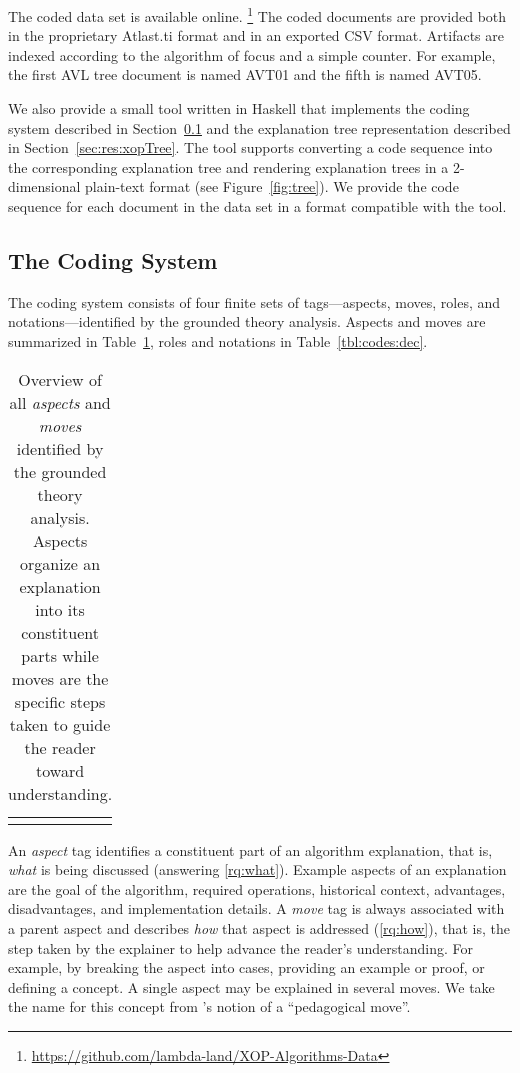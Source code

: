 \documentclass[sigconf]{acmart}
\begin{document}
The coded data set is available online.%
\footnote{\url{https://github.com/lambda-land/XOP-Algorithms-Data}}
%
The coded documents are provided both in the proprietary Atlast.ti format and
in an exported CSV format.
%
Artifacts are indexed according to the algorithm of focus and a simple counter.
For example, the first AVL tree document is named AVT01 and the fifth is named
AVT05.


We also provide a small tool written in Haskell that implements the coding
system described in Section~\ref{sec:res:sys} and the explanation tree
representation described in Section~\ref{sec:res:xopTree}. The tool supports
converting a code sequence into the corresponding explanation tree and
rendering explanation trees in a 2-dimensional plain-text format (see
Figure~\ref{fig:tree}).
%
We provide the code sequence for each document in the data set in a format
compatible with the tool.


\subsection{The Coding System}
\label{sec:res:sys}

The coding system consists of four finite sets of tags---aspects, moves, roles,
and notations---identified by the grounded theory analysis. Aspects and moves
are summarized in Table~\ref{tbl:codes:main}, roles and notations in
Table~\ref{tbl:codes:dec}.


\begin{table}
\begin{tabular}{ll}

\\[-1.5ex]

\\[-1.5ex]
\end{tabular}
\caption{Overview of all \emph{aspects} and \emph{moves} identified by the grounded theory
analysis. Aspects organize an explanation into its constituent parts while
moves are the specific steps taken to guide the reader toward understanding.}
\label{tbl:codes:main}
\vspace{-5ex}
\end{table}


An \emph{aspect} tag identifies a constituent part of an algorithm explanation,
that is, \emph{what} is being discussed (answering \ref{rq:what}). Example
aspects of an explanation are the goal of the algorithm, required operations,
historical context, advantages, disadvantages, and implementation details.
%
A \emph{move} tag is always associated with a parent aspect and describes
\emph{how} that aspect is addressed (\ref{rq:how}), that is, the step taken by
the explainer to help advance the reader's understanding. For example, by
breaking the aspect into cases, providing an example or proof, or defining a
concept. A single aspect may be explained in several moves. We take the name
for this concept from \citet{bellack1966language}'s notion of a ``pedagogical
move''.
\end{document}
